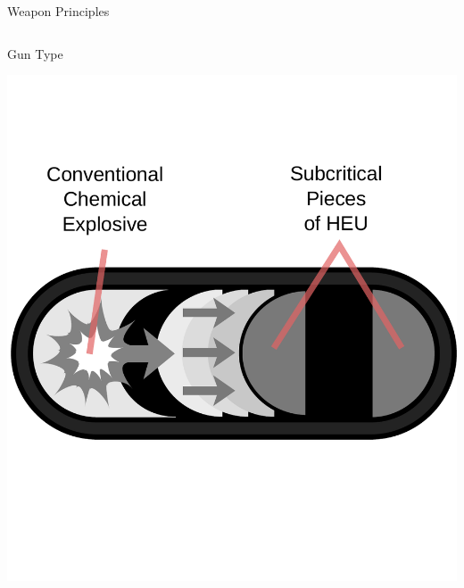 \documentclass[presentation]{beamer}
\begin{document}
\begin{frame}[label=sec-1-5]{Weapon Principles}
\vspace{-0.7cm}
\begin{columns}[t]
\begin{column}{0.45\textwidth}
\begin{block}{Gun Type}

\includegraphics[width=\textwidth]{images/guntype_modified}
\end{block}
\end{column}


\end{columns}
\end{frame}
\end{document}
